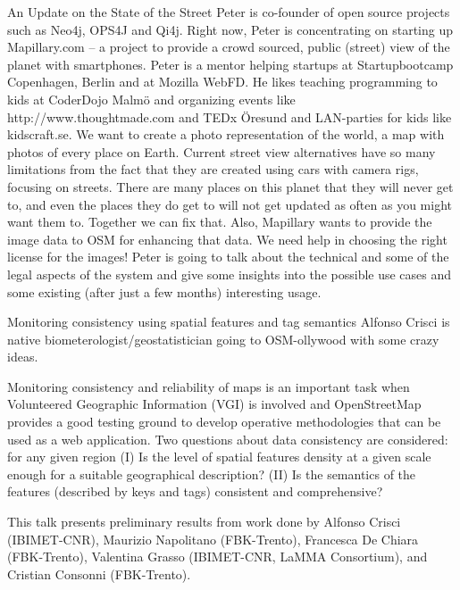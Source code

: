 %
{An Update on the State of the Street}%
{Peter is co-founder of open source projects such as Neo4j, OPS4J and Qi4j. Right now, Peter is concentrating on starting up Mapillary.com -- a project to provide a crowd sourced, public (street) view of the planet with smartphones. Peter is a mentor helping startups at Startupbootcamp Copenhagen, Berlin and at Mozilla WebFD. He likes teaching programming to kids at CoderDojo Malmö and organizing events like http://www.thoughtmade.com and TEDx Öresund and LAN-parties for kids like kidscraft.se.}%
{We want to create a photo representation of the world, a map with photos of every place on Earth. Current street view alternatives have so many limitations from the fact that they are created using cars with camera rigs, focusing on streets. There are many places on this planet that they will never get to, and even the places they do get to will not get updated as often as you might want them to. Together we can fix that. Also, Mapillary wants to provide the image data to OSM for enhancing that data. We need help in choosing the right license for the images! Peter is going to talk about the technical and some of the legal aspects of the system and give some insights into the possible use cases and some existing (after just a few months) interesting usage.}

%
{Monitoring consistency using spatial features and tag semantics}%
{Alfonso Crisci is native biometerologist/geostatistician going to OSM-ollywood with some crazy ideas.}%
{Monitoring consistency and reliability of maps is an important task when Volunteered Geographic Information (VGI) is involved and OpenStreetMap provides a good testing ground to develop operative methodologies that can be used as a web application. Two questions about data consistency are considered: for any given region (I) Is the level of spatial features density at a given scale enough for a suitable geographical description? (II) Is the semantics of the features (described by keys and tags) consistent and comprehensive?

This talk presents preliminary results from work done by Alfonso Crisci (IBIMET-CNR), Maurizio Napolitano (FBK-Trento), Francesca De Chiara (FBK-Trento), Valentina Grasso (IBIMET-CNR, LaMMA Consortium), and Cristian Consonni (FBK-Trento).}

